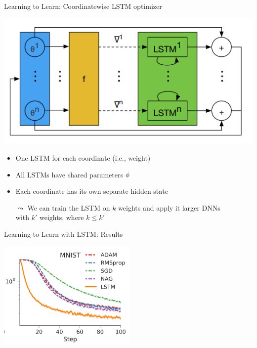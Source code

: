 \begin{frame}[c]{Learning to Learn: Coordinatewise LSTM optimizer }

\centering
\includegraphics[width=.5\textwidth]{images/l2l_shared_lstm.png}

\begin{itemize}
\item One LSTM for each coordinate (i.e., weight)
\item All LSTMs have shared parameters $\phi$
\item Each coordinate has its own separate hidden state
\pause
\item[$\leadsto$] We can train the LSTM on $k$ weights and apply it larger DNNs\\ with $k'$ weights, where $k \leq k'$
\end{itemize}

\end{frame}
\begin{frame}[c]{Learning to Learn with LSTM: Results }

\centering
\includegraphics[width=0.5\textwidth]{images/l2l_mnist_base}

\end{frame}
